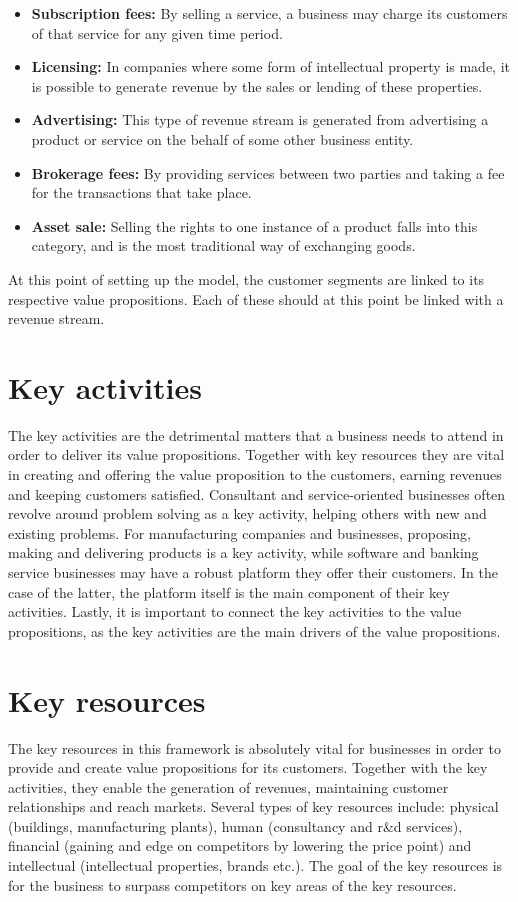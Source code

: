 \begin{itemize}
    \item \textbf{Subscription fees: }By selling a service, a business may charge its customers of that service for any given time period. 
    \item \textbf{Licensing: }In companies where some form of intellectual property is made, it is possible to generate revenue by the sales or lending of these properties.
    \item \textbf{Advertising: }This type of revenue stream is generated from advertising a product or service on the behalf of some other business entity.
    \item \textbf{Brokerage fees: }By providing services between two parties and taking a fee for the transactions that take place.
    \item \textbf{Asset sale: }Selling the rights to one instance of a product falls into this category, and is the most traditional way of exchanging goods.
\end{itemize}

At this point of setting up the model, the customer segments are linked to its respective value propositions. Each of these should at this point be linked with a revenue stream.

\section{Key activities}
The key activities are the detrimental matters that a business needs to attend in order to deliver its value propositions. Together with key resources they are vital in creating and offering the value proposition to the customers, earning revenues and keeping customers satisfied. Consultant and service-oriented businesses often revolve around problem solving as a key activity, helping others with new and existing problems. For manufacturing companies and businesses, proposing, making and delivering products is a key activity, while software and banking service businesses may have a robust platform they offer their customers. In the case of the latter, the platform itself is the main component of their key activities. Lastly, it is important to connect the key activities to the value propositions, as the key activities are the main drivers of the value propositions.

\section{Key resources}
The key resources in this framework is absolutely vital for businesses in order to provide and create value propositions for its customers. Together with the key activities, they enable the generation of revenues, maintaining customer relationships and reach markets. Several types of key resources include:  physical (buildings, manufacturing plants), human (consultancy and r\&d services), financial (gaining and edge on competitors by lowering the price point) and intellectual (intellectual properties, brands etc.). The goal 
of the key resources is for the business to surpass competitors on key areas of the key resources.

